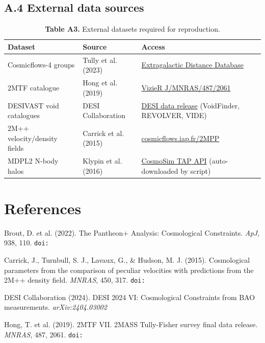 \documentclass[11pt,a4paper]{article}
\begin{document}
\subsection{A.4 External data sources}
\begin{table}[H]
\centering
\footnotesize
\caption{\textbf{Table A3.} External datasets required for reproduction.}
\begin{tabularx}{\linewidth}{l>{\RaggedRight\arraybackslash}X>{\RaggedRight\arraybackslash}X}
\toprule
\textbf{Dataset} & \textbf{Source} & \textbf{Access} \tabularnewline
\midrule
Cosmicflows-4 groups & Tully et al. (2023) & \href{https://edd.ifa.hawaii.edu/CF4groupsHD/}{Extragalactic Distance Database} \tabularnewline
2MTF catalogue & Hong et al. (2019) & \href{https://vizier.cds.unistra.fr/viz-bin/VizieR-3?-source=J/MNRAS/487/2061}{VizieR J/\allowbreak{}MNRAS/\allowbreak{}487/\allowbreak{}2061} \tabularnewline
DESIVAST void catalogues & DESI Collaboration & \href{https://data.desi.lbl.gov/public/papers/c3/void\_catalog\_dr1/v1/}{DESI data release} (VoidFinder, REVOLVER, VIDE) \tabularnewline
2M++ velocity/\allowbreak{}density fields & Carrick et al. (2015) & \href{https://cosmicflows.iap.fr/2MPP/}{cosmicflows.iap.fr/\allowbreak{}2MPP} \tabularnewline
MDPL2 N-body halos & Klypin et al. (2016) & \href{https://www.cosmosim.org/}{CosmoSim TAP API} (auto-downloaded by script) \tabularnewline
\bottomrule
\end{tabularx}
\end{table}

\section{References}
\label{sec:sec11}
Brout, D. et al. (2022). The Pantheon+ Analysis: Cosmological Constraints. \emph{ApJ}, 938, 110. \texttt{doi:{\small\protect{}}}

Carrick, J., Turnbull, S. J., Lavaux, G., \& Hudson, M. J. (2015). Cosmological parameters from the comparison of peculiar velocities with predictions from the 2M++ density field. \emph{MNRAS}, 450, 317. \texttt{doi:{\small\protect{}}}

DESI Collaboration (2024). DESI 2024 VI: Cosmological Constraints from BAO measurements. \emph{arXiv:2404.03002}

Hong, T. et al. (2019). 2MTF VII. 2MASS Tully-Fisher survey final data release. \emph{MNRAS}, 487, 2061. \texttt{doi:{\small\protect{}}}
\end{document}
